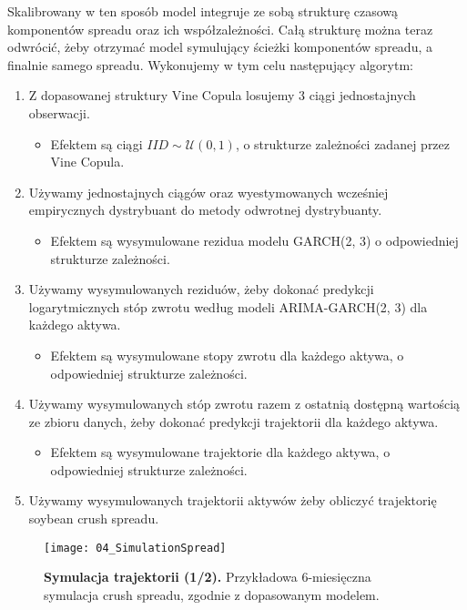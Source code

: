Skalibrowany w ten sposób model integruje ze sobą strukturę czasową komponentów spreadu oraz ich współzależności. Całą strukturę można teraz odwrócić, żeby otrzymać model symulujący ścieżki komponentów spreadu, a finalnie samego spreadu. Wykonujemy w tym celu następujący algorytm:
\begin{enumerate}
	\item Z dopasowanej struktury Vine Copula losujemy 3 ciągi jednostajnych obserwacji.
	\begin{itemize}
		\item Efektem są ciągi $IID\sim\mathcal{U}(0, 1)$, o strukturze zależności zadanej przez Vine Copula.
	\end{itemize}
	\item Używamy jednostajnych ciągów oraz wyestymowanych wcześniej empirycznych dystrybuant do metody odwrotnej dystrybuanty.
	\begin{itemize}
		\item Efektem są wysymulowane rezidua modelu GARCH(2, 3) o odpowiedniej strukturze zależności.
	\end{itemize}
	\item Używamy wysymulowanych reziduów, żeby dokonać predykcji logarytmicznych stóp zwrotu według modeli ARIMA-GARCH(2, 3) dla każdego aktywa. 
	\begin{itemize}
		\item Efektem są wysymulowane stopy zwrotu dla każdego aktywa, o odpowiedniej strukturze zależności.
	\end{itemize}
	\item Używamy wysymulowanych stóp zwrotu razem z ostatnią dostępną wartością ze zbioru danych, żeby dokonać predykcji trajektorii dla każdego aktywa. 
	\begin{itemize}
		\item Efektem są wysymulowane trajektorie dla każdego aktywa, o odpowiedniej strukturze zależności.
	\end{itemize}
	\item Używamy wysymulowanych trajektorii aktywów żeby obliczyć trajektorię soybean crush spreadu.
	
\end{enumerate}
\begin{figure}[h]
	\centering
	\texttt{[image: 04\_SimulationSpread]}
	\caption{\textbf{Symulacja trajektorii (1/2).} Przykładowa $6$-miesięczna symulacja crush spreadu, zgodnie z dopasowanym modelem.\label{fig:simulation_spread}}
\end{figure}

